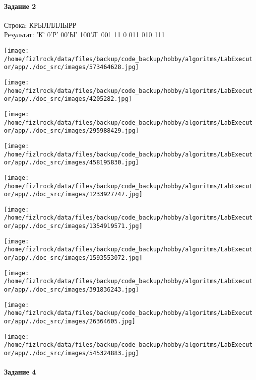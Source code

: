 \documentclass[a4paper, 12pt]{article}
\begin{document}
\paragraph{Задание 2}

Строка: 
КРЫЛЛЛЛЫРР\\
Результат: 'К' 0'Р' 00'Ы' 100'Л' 001 11 0 011 010 111

\texttt{[image: /home/fizlrock/data/files/backup/code\_backup/hobby/algoritms/LabExecutor/app/./doc\_src/images/573464628.jpg]}

\texttt{[image: /home/fizlrock/data/files/backup/code\_backup/hobby/algoritms/LabExecutor/app/./doc\_src/images/4205282.jpg]}

\texttt{[image: /home/fizlrock/data/files/backup/code\_backup/hobby/algoritms/LabExecutor/app/./doc\_src/images/295988429.jpg]}

\texttt{[image: /home/fizlrock/data/files/backup/code\_backup/hobby/algoritms/LabExecutor/app/./doc\_src/images/458195830.jpg]}

\texttt{[image: /home/fizlrock/data/files/backup/code\_backup/hobby/algoritms/LabExecutor/app/./doc\_src/images/1233927747.jpg]}

\texttt{[image: /home/fizlrock/data/files/backup/code\_backup/hobby/algoritms/LabExecutor/app/./doc\_src/images/1354919571.jpg]}

\texttt{[image: /home/fizlrock/data/files/backup/code\_backup/hobby/algoritms/LabExecutor/app/./doc\_src/images/1593553072.jpg]}

\texttt{[image: /home/fizlrock/data/files/backup/code\_backup/hobby/algoritms/LabExecutor/app/./doc\_src/images/391836243.jpg]}

\texttt{[image: /home/fizlrock/data/files/backup/code\_backup/hobby/algoritms/LabExecutor/app/./doc\_src/images/26364605.jpg]}

\texttt{[image: /home/fizlrock/data/files/backup/code\_backup/hobby/algoritms/LabExecutor/app/./doc\_src/images/545324883.jpg]}
\pagebreak
\paragraph{Задание 4}
\end{document}

